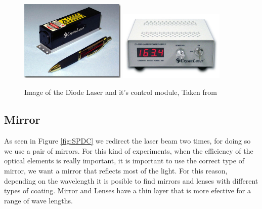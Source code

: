 \begin{figure}[h!]
\centering
{  \includegraphics[width=0.45\textwidth]{Figures/diodeLaser.jpg} }
{  \includegraphics[width=0.45\textwidth]{Figures/diodeLaserControl.jpg} }
\caption{Image of the Diode Laser and it's control module, Taken from \cite{crystalLaser}}
 \label{fig:diodeLaser}
\end{figure}




\subsection{Mirror}
As seen in Figure \ref{fig:SPDC} we redirect the laser beam two times, for doing
so we use a pair of mirrors. For this kind of experiments, when the efficiency 
of the optical elements is really important, it is important to use the correct type
of mirror, we want a mirror that reflects most of the light. For this reason, depending
on the wavelength it is posible to find mirrors and lenses with different types of 
coating. Mirror and Lenses have a thin layer that is more efective for a range 
of wave lengths.

